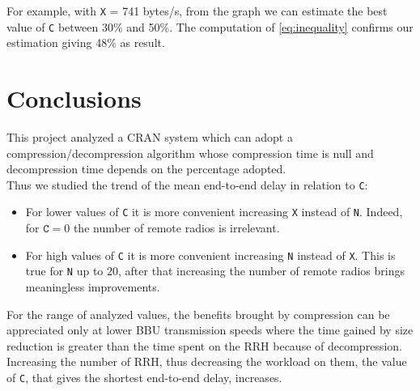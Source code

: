 \documentclass[11pt,a4paper,oneside, openright]{article}
\begin{document}
For example, with \texttt{X} = 741 bytes/s, from the graph we can estimate the best value of \texttt{C} between 30\% and 50\%. The computation of \ref{eq:inequality} confirms our estimation giving 48\% as result.

\newpage
\section{Conclusions}
This project analyzed a CRAN system which can adopt a compression/decompression algorithm whose compression time is null and decompression time depends on the percentage adopted.\\
Thus we studied the trend of the mean end-to-end delay in relation to \texttt{C}: 
\begin{itemize}
	\item For lower values of \texttt{C} it is more convenient increasing \texttt{X} instead of \texttt{N}. Indeed, for $\texttt{C} = 0 $ the number of remote radios is irrelevant.
	\item For high values of \texttt{C} it is more convenient increasing \texttt{N} instead of \texttt{X}. This is true for \texttt{N} up to 20, after that increasing the number of remote radios brings meaningless improvements.
\end{itemize}
For the range of analyzed values, the benefits brought by compression can be appreciated only at lower BBU transmission speeds where the time gained by size reduction is greater than the time spent on the RRH because of decompression. Increasing the number of RRH, thus decreasing the workload on them, the value of \texttt{C}, that gives the shortest end-to-end delay, increases.
\end{document}
